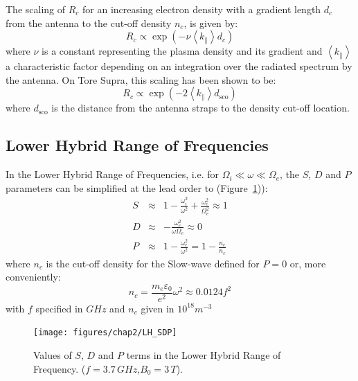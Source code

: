 The scaling of $R_c$ for an increasing electron density with a gradient length $d_c$ from the antenna to the cut-off density $n_c$,  is given by:
\begin{equation}
	R_c \propto \exp\left(- \nu \left< k_\parallel \right> d_c \right)
\end{equation}
where $\nu$ is a constant representing the plasma density and its gradient and $\left< k_\parallel \right>$ a characteristic factor depending on an integration over the radiated spectrum by the antenna.  On Tore Supra, this scaling has been shown to be:
\begin{equation}
R_c \propto \exp\left(- 2 \left< k_\parallel \right> d_{\mathrm{sco}} \right)
\end{equation}
where $d_{\mathrm{sco}}$ is the distance from the antenna straps to the density cut-off location. 







\subsection{Lower Hybrid Range of Frequencies}\label{sec:lhcd}
In the Lower Hybrid Range of Frequencies, i.e. for $\Omega_i \ll \omega \ll \Omega_e$, the $S$, $D$ and $P$ parameters can be simplified at the lead order \cite[p.222]{Brambilla1998} to (Figure~\ref{fig:lhsdp})):
\begin{subequations}
	\begin{eqnarray}
		S &\approx& 1 - \frac{\omega_i^2}{\omega^2} + \frac{\omega_e^2}{\Omega_e^2} \approx 1 \\
		D &\approx& - \frac{\omega_e^2}{\omega \Omega_e} \approx 0 \\
		P &\approx& 1 - \frac{\omega_e^2}{\omega^2} = 1 - \frac{n_e}{n_c}
	\end{eqnarray}
\end{subequations}
where $n_c$ is the cut-off density for the Slow-wave defined for $P=0$ or, more conveniently:
\begin{equation}
	n_c = \frac{m_e \varepsilon_{0}}{e^2} \omega^2 \approx  0.0124 f^2
	\label{eq:lh_cutoff_density}
\end{equation}
with $f$ specified in $\si{GHz}$ and $n_c$ given in $10^{18}\si{m^{-3}}$ 
\begin{figure}[h]
	\centering
	\texttt{[image: figures/chap2/LH\_SDP]}
	\caption{Values of $S$, $D$ and $P$ terms in the Lower Hybrid Range of Frequency. ($f=3.7\,\si{GHz}$,$B_0=3\,\si{T}$).}
	\label{fig:lhsdp}
\end{figure}



